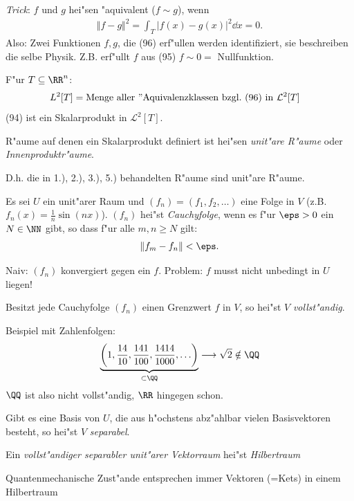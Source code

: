 \documentclass[a4paper]{scrartcl}
\begin{document}
{\emph{Trick}: $f$ und $g$ hei"sen "aquivalent ($f \sim g$), wenn 
\begin{align}
\Vert f - g \Vert^2 = \int_T \vert f(x) - g(x) \vert^2 \dd x = 0.
\end{align}
Also: Zwei Funktionen $f,g$, die (96) erf"ullen werden identifiziert, sie beschreiben die selbe Physik. Z.B. erf"ullt $f$ aus (95) $f \sim 0 = $ Nullfunktion.
\begin{1aufz}
\setcounter{enumi}{4}
\item F"ur $T \subseteq \RR^n$:
\begin{align}
L^2[T] & = \mathrm{ Menge \ aller \ "Aquivalenzklassen \ bzgl. \ (96) \ in \ } \mathcal L^2[T]
\end{align}
(94) ist ein Skalarprodukt in $\mathcal L^2[T]$.
\end{1aufz}
R"aume auf denen ein Skalarprodukt definiert ist hei"sen \emph{unit"are R"aume} oder \emph{Innenproduktr"aume}.

D.h. die in 1.), 2.), 3.), 5.) behandelten R"aume sind unit"are R"aume.

Es sei $U$ ein unit"arer Raum und $(f_n) = (f_1, f_2, \ldots)$ eine Folge in $V$ (z.B. $f_n(x) = \frac1n \sin(nx)$). $(f_n)$ hei"st \emph{Cauchyfolge}, wenn es f"ur $\eps > 0$ ein $N \in \NN$ gibt, so dass f"ur alle $m,n \geq N$ gilt:
$$\Vert f_m - f_n \Vert < \eps.$$

Naiv: $(f_n)$ konvergiert gegen ein $f$. Problem: $f$ musst nicht unbedingt in $U$ liegen! 

Besitzt jede Cauchyfolge $(f_n)$ einen Grenzwert $f$ in $V$, so hei"st $V$ \emph{vollst"andig}.

Beispiel mit Zahlenfolgen:
$$\underbrace{\left( 1, \frac{14}{10}, \frac{141}{100}, \frac{1414}{1000}, \ldots \right)}_{\subset \QQ} \longrightarrow \sqrt 2 \notin \QQ$$
$\QQ$ ist also nicht vollst"andig, $\RR$ hingegen schon.

Gibt es eine Basis von $U$, die aus h"ochstens abz"ahlbar vielen Basisvektoren besteht, so hei"st $V$ \emph{separabel}.

Ein \emph{vollst"andiger separabler unit"arer Vektorraum} hei"st \emph{Hilbertraum}

Quantenmechanische Zust"ande entsprechen immer Vektoren (=Kets) in einem Hilbertraum

}
\end{document}
